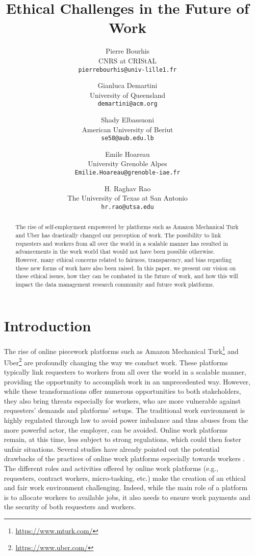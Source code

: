 \documentclass[11pt]{article}
\title{Ethical Challenges in the Future of Work}
\author{Pierre Bourhis\\
CNRS at CRIStAL\\
\texttt{{\footnotesize pierrebourhis@univ-lille1.fr}}
\and
Gianluca Demartini \\
University of Queensland\\
\texttt{{\footnotesize demartini@acm.org}}
\and
Shady Elbassuoni\\
American University of  Beriut\\
\texttt{{\footnotesize se58@aub.edu.lb}}
\and
Emile Hoareau\\
University Grenoble Alpes\\
\texttt{{\footnotesize Emilie.Hoareau@grenoble-iae.fr}}
\and
H. Raghav Rao\\
The University of Texas at San Antonio\\
\texttt{{\footnotesize hr.rao@utsa.edu}}
}
\newcommand{\pierre}[1]{\textbf{Pierre:}#1}
\begin{document}
\maketitle

\begin{abstract}
The rise of self-employment empowered by platforms such as Amazon Mechanical Turk and Uber has drastically changed our perception of work. The possibility to link requesters and workers from all over the world in a scalable manner has resulted in advancements in the work world that would not have been possible otherwise. However, many ethical concerns related to fairness, transparency, and bias regarding these new forms of work have also been raised. In this paper, we present our vision on these ethical issues, how they can be combated in the future of work, and how this will impact the data management research community and future work platforms.
\end{abstract}

\section{Introduction}  
The rise of online piecework platforms such as Amazon Mechanical Turk\footnote{\url{https://www.mturk.com/}} and Uber\footnote{\url{https://www.uber.com/}} are profoundly changing the way we conduct work. These platforms typically link requesters to workers from all over the world in a scalable manner, providing the opportunity to  accomplish work in an unprecedented way. However, while these transformations offer numerous opportunities to both stakeholders, they also bring threats especially for workers, who are more vulnerable against requesters' demands and platforms' setups. The traditional work environment is highly regulated through law to avoid power imbalance and thus abuses from the more powerful actor, the employer, can be avoided. Online work platforms remain, at this time, less subject to strong regulations, which could then foster unfair situations. Several studies have already pointed out the potential drawbacks of the practices of online work platforms especially towards workers \cite{kittur2013future}. The different roles and activities offered by online work platforms (e.g., requesters, contract workers, micro-tasking, etc.) make  the creation of an ethical and fair work environment challenging. 
Indeed, while the main role of a platform is to allocate workers to  available jobs, it also needs to ensure work payments  and the security of both requesters and workers. 
\end{document}

